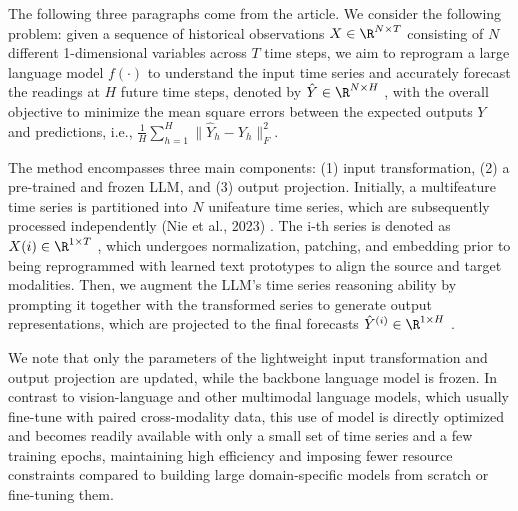 


The following three paragraphs come from the article.
We consider the following problem: given a sequence of historical observations \(X \in \R^{N\times T}\)
consisting of \(N\) different 1-dimensional variables across \(T\) time steps, we aim to reprogram a large
language model \(f(\cdot)\) to understand the input time series and accurately forecast the readings at \(H\) future time steps, denoted by \(\hat{Y} \in \R^{N\times H}\) , with the overall objective to minimize the mean square errors between the expected outputs \(Y\) and predictions, i.e., \(\frac1H \sum_{h=1}^H \| \hat{Y}_h - Y_h \|_F^2 \).

The method encompasses three main components: (1) input transformation, (2) a pre-trained and frozen LLM, and (3) output projection. Initially, a multifeature time series is partitioned into \(N\) unifeature time series, which are subsequently processed independently (Nie et al., 2023) \cite{nie_et_al}.
The i-th series is denoted as \(X(i) \in \R^{1\times T}\) , which undergoes normalization, patching, and embedding prior to being reprogrammed with learned text prototypes to align the source and target modalities.
Then, we augment the LLM’s time series reasoning ability by prompting it together with the transformed series to generate output representations, which are projected to the final forecasts \(\hat{Y}^{(i)} \in \R^{1\times H}\) .

We note that only the parameters of the lightweight input transformation and output projection are updated, while the backbone language model is frozen.
In contrast to vision-language and other multimodal language models, which usually fine-tune with paired cross-modality data, this use of model is directly optimized and becomes readily available with only a small set of time series and a few  training epochs, maintaining high efficiency and imposing fewer resource constraints compared to building large domain-specific models from scratch or fine-tuning them.

